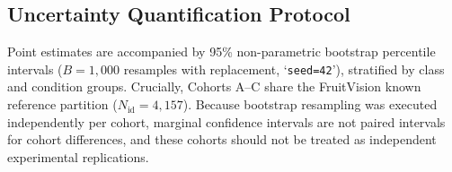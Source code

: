 \subsection{Uncertainty Quantification Protocol}
Point estimates are accompanied by 95\% non-parametric bootstrap percentile intervals ($B = 1,000$ resamples with replacement, `\texttt{seed=42}'), stratified by class and condition groups. Crucially, Cohorts A--C share the FruitVision known reference partition ($N_{\text{id}} = 4,157$). Because bootstrap resampling was executed independently per cohort, marginal confidence intervals are not paired intervals for cohort differences, and these cohorts should not be treated as independent experimental replications.
